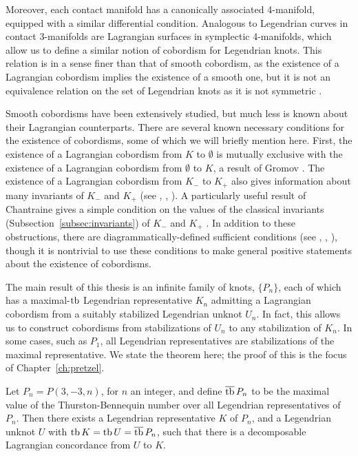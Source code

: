 Moreover, each contact manifold has a canonically associated 4-manifold, equipped with a similar differential condition. Analogous to Legendrian curves in contact 3-manifolds are Lagrangian surfaces in symplectic 4-manifolds, which allow us to define a similar notion of cobordism for Legendrian knots.
This relation is in a sense finer than that of smooth cobordism, as the existence of a Lagrangian cobordism implies the existence of a smooth one, but it is not an equivalence relation on the set of Legendrian knots as it is not symmetric \cite{chantraine2015}.

Smooth cobordisms have been extensively studied, but much less is known about their Lagrangian counterparts. There are several known necessary conditions for the existence of cobordisms, some of which we will briefly mention here.
First, the existence of a Lagrangian cobordism from $K$ to $\emptyset$ is mutually exclusive with the existence of a Lagrangian cobordism from $\emptyset$ to $K$, a result of Gromov \cite{gromov}.
The existence of a Lagrangian cobordism from $K_-$ to $K_+$ also gives information about many invariants of $K_-$ and $K_+$ (see \cite{pan}, \cite{cdrg}, \cite{baldwin}). 
A particularly useful result of Chantraine gives a simple condition on the values of the classical invariants (Subsection~\ref{subsec:invariants}) of $K_-$ and $K_+$ \cite{chantraine2010}.
In addition to these obstructions, there are diagrammatically-defined sufficient conditions (see \cite{bourgeois15}, \cite{lin}, \cite{guadagni}), though it is nontrivial to use these conditions to make general positive statements about the existence of cobordisms.

The main result of this thesis is an infinite family of knots, $\{P_n\}$, each of which has a maximal-$\operatorname{tb}$ Legendrian representative $K_n$ admitting a Lagrangian cobordism from a suitably stabilized Legendrian unknot $U_n$. In fact, this allows us to construct cobordisms from stabilizations of $U_n$ to any stabilization of $K_n$. In some cases, such as $P_1$, all Legendrian representatives are stabilizations of the maximal representative.
We state the theorem here; the proof of this is the focus of Chapter~\ref{ch:pretzel}.

\begin{mythmcopy}
     Let $P_n = P(3, -3, n)$, for $n$ an integer, and define $\overline{\operatorname{tb}}\, P_n$ to be the maximal value of the Thurston-Bennequin number over all Legendrian representatives of $P_n$. Then there exists a Legendrian representative $K$ of $P_n$, and a Legendrian unknot $U$ with $\operatorname{tb} K = \operatorname{tb} U = \overline{\operatorname{tb}}\, P_n$, such that there is a decomposable Lagrangian concordance from $U$ to $K$.
\end{mythmcopy}


